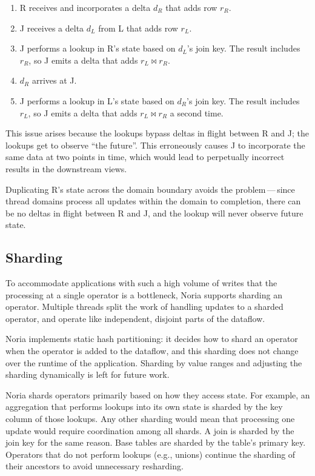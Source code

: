 \begin{enumerate}
  \item R receives and incorporates a delta $d_R$ that adds row $r_R$.
  \item J receives a delta $d_L$ from L that adds row $r_L$.
  \item J performs a lookup in R's state based on $d_L$'s join key. The result
    includes $r_R$, so J emits a delta that adds $r_L \bowtie r_R$.
  \item $d_R$ arrives at J.
  \item J performs a lookup in L's state based on $d_R$'s join key. The result
    includes $r_L$, so J emits a delta that adds $r_L \bowtie r_R$ a second
    time.
\end{enumerate}

This issue arises because the lookups bypass deltas in flight between R and J;
the lookups get to observe ``the future''. This erroneously causes J to
incorporate the same data at two points in time, which would lead to perpetually
incorrect results in the downstream views.

Duplicating R's state across the domain boundary avoids the problem\,---\,since
thread domains process all updates within the domain to completion, there can be
no deltas in flight between R and J, and the lookup will never observe future
state.

\subsection{Sharding}
\label{s:noria:sharding}

To accommodate applications with such a high volume of writes that the
processing at a single operator is a bottleneck, Noria supports sharding an
operator. Multiple threads split the work of handling updates to a sharded
operator, and operate like independent, disjoint parts of the dataflow.

Noria implements static hash partitioning: it decides how to shard an operator
when the operator is added to the dataflow, and this sharding does not change
over the runtime of the application. Sharding by value ranges and adjusting the
sharding dynamically is left for future work.

Noria shards operators primarily based on how they access state. For example, an
aggregation that performs lookups into its own state is sharded by the key
column of those lookups. Any other sharding would mean that processing one
update would require coordination among all shards. A join is sharded by the
join key for the same reason. Base tables are sharded by the table's primary
key. Operators that do not perform lookups (e.g., unions) continue the sharding
of their ancestors to avoid unnecessary resharding.

